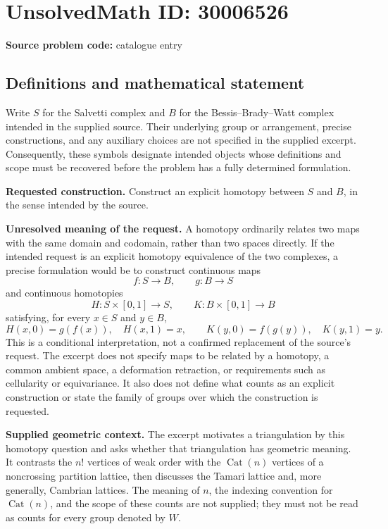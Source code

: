 \documentclass[11pt]{article}
\begin{document}
\section*{UnsolvedMath ID: 30006526}
\textbf{Source problem code:} catalogue entry
\subsection{Definitions and mathematical statement}
Write \(S\) for the Salvetti complex and \(B\) for the Bessis--Brady--Watt complex intended in the supplied source. Their underlying group or arrangement, precise constructions, and any auxiliary choices are not specified in the supplied excerpt. Consequently, these symbols designate intended objects whose definitions and scope must be recovered before the problem has a fully determined formulation.

\textbf{Requested construction.} Construct an explicit homotopy between \(S\) and \(B\), in the sense intended by the source.

\textbf{Unresolved meaning of the request.} A homotopy ordinarily relates two maps with the same domain and codomain, rather than two spaces directly. If the intended request is an explicit homotopy equivalence of the two complexes, a precise formulation would be to construct continuous maps
\[
 f:S\longrightarrow B,\qquad g:B\longrightarrow S
\]
and continuous homotopies
\[
 H:S\times[0,1]\longrightarrow S,\qquad K:B\times[0,1]\longrightarrow B
\]
satisfying, for every \(x\in S\) and \(y\in B\),
\[
 H(x,0)=g(f(x)),\quad H(x,1)=x,
 \qquad
 K(y,0)=f(g(y)),\quad K(y,1)=y.
\]
This is a conditional interpretation, not a confirmed replacement of the source's request. The excerpt does not specify maps to be related by a homotopy, a common ambient space, a deformation retraction, or requirements such as cellularity or equivariance. It also does not define what counts as an explicit construction or state the family of groups over which the construction is requested.

\textbf{Supplied geometric context.} The excerpt motivates a triangulation by this homotopy question and asks whether that triangulation has geometric meaning. It contrasts the \(n!\) vertices of weak order with the \(\operatorname{Cat}(n)\) vertices of a noncrossing partition lattice, then discusses the Tamari lattice and, more generally, Cambrian lattices. The meaning of \(n\), the indexing convention for \(\operatorname{Cat}(n)\), and the scope of these counts are not supplied; they must not be read as counts for every group denoted by \(W\).
\end{document}
